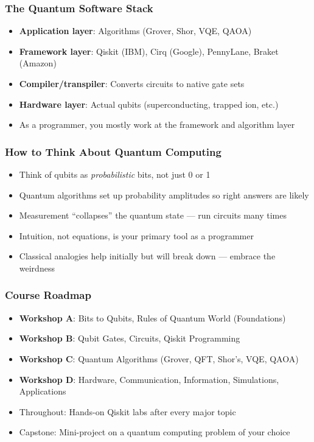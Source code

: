 \begin{frame}[fragile]\frametitle{The Quantum Software Stack}
\begin{itemize}
\item \textbf{Application layer}: Algorithms (Grover, Shor, VQE, QAOA)
\item \textbf{Framework layer}: Qiskit (IBM), Cirq (Google), PennyLane, Braket (Amazon)
\item \textbf{Compiler/transpiler}: Converts circuits to native gate sets
\item \textbf{Hardware layer}: Actual qubits (superconducting, trapped ion, etc.)
\item As a programmer, you mostly work at the framework and algorithm layer
\end{itemize}
\end{frame}

\begin{frame}[fragile]\frametitle{How to Think About Quantum Computing}
\begin{itemize}
\item Think of qubits as \textit{probabilistic} bits, not just 0 or 1
\item Quantum algorithms set up probability amplitudes so right answers are likely
\item Measurement ``collapses'' the quantum state --- run circuits many times
\item Intuition, not equations, is your primary tool as a programmer
\item Classical analogies help initially but will break down --- embrace the weirdness
\end{itemize}
\end{frame}

\begin{frame}[fragile]\frametitle{Course Roadmap}
\begin{itemize}
\item \textbf{Workshop A}: Bits to Qubits, Rules of Quantum World (Foundations)
\item \textbf{Workshop B}: Qubit Gates, Circuits, Qiskit Programming
\item \textbf{Workshop C}: Quantum Algorithms (Grover, QFT, Shor's, VQE, QAOA)
\item \textbf{Workshop D}: Hardware, Communication, Information, Simulations, Applications
\item Throughout: Hands-on Qiskit labs after every major topic
\item Capstone: Mini-project on a quantum computing problem of your choice
\end{itemize}
\end{frame}

